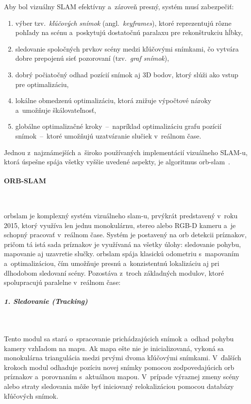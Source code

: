       Aby bol vizuálny SLAM efektívny a~zároveň presný, systém musí zabezpečiť:
      \begin{enumerate}
        \item výber tzv.\ \emph{kľúčových snímok} (angl.\ \emph{keyframes}), ktoré reprezentujú rôzne pohľady na scénu a~poskytujú dostatočnú paralaxu pre rekonštrukciu hĺbky,
        \item sledovanie spoločných prvkov scény medzi kľúčovými snímkami, čo vytvára dobre prepojenú sieť pozorovaní (tzv.\ \emph{graf snímok}),
        \item dobrý počiatočný odhad pozícií snímok aj 3D bodov, ktorý slúži ako vstup pre optimalizáciu,
        \item lokálne obmedzenú optimalizáciu, ktorá znižuje výpočtové nároky a~umožňuje škálovateľnosť,
        \item globálne optimalizačné kroky~--~napríklad optimalizáciu grafu pozícií snímok~--~ktoré umožňujú uzatváranie slučiek v~reálnom čase.
      \end{enumerate}

      Jednou z~najznámejších a~široko používaných implementácií vizuálneho SLAM-u, ktorá úspešne spája všetky vyššie uvedené aspekty, je algoritmus \acrshort{orb}-\acrshort{slam}~\cite{mur-artalORBSLAMVersatileAccurate2015}.

      \paragraph{ORB-SLAM} \

        \noindent \acrshort{orbslam} je komplexný systém vizuálneho \acrshort{slam}-u, prvýkrát predstavený v~roku 2015, ktorý využíva len jednu monokulárnu, stereo alebo RGB-D kameru a~je schopný pracovať v~reálnom čase. Systém je postavený na \acrshort{orb} detekcii príznakov, pričom tá istá sada príznakov je využívaná na všetky úlohy: sledovanie pohybu, mapovanie aj uzavretie slučky\@. \acrshort{orbslam} spája klasickú odometriu s~mapovaním a~optimalizáciou, čím umožňuje presnú a~konzistentnú lokalizáciu aj pri dlhodobom sledovaní scény. Pozostáva z~troch základných modulov, ktoré spolupracujú paralelne v~reálnom čase:

        \subparagraph{1. Sledovanie (Tracking)} \
        
          Tento modul sa stará o~spracovanie prichádzajúcich snímok a~odhad pohybu kamery vzhľadom na mapu. Ak mapa ešte nie je inicializovaná, vykoná sa monokulárna triangulácia medzi prvými dvoma kľúčovými snímkami. V~ďalších krokoch modul odhaduje pozíciu novej snímky pomocou zodpovedajúcich \acrshort{orb} príznakov a~porovnaním s~aktuálnou mapou. V~prípade výraznej zmeny scény alebo straty sledovania môže byť iniciovaný relokalizáciou pomocou databázy kľúčových snímok.

